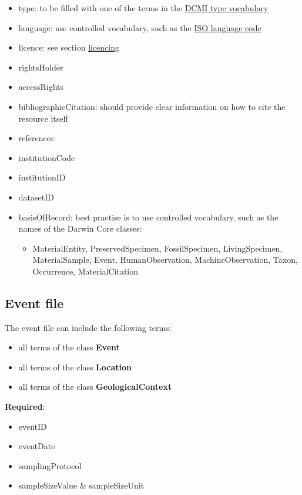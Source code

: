 \documentclass[
]{book}
\providecommand{\tightlist}{%
  \setlength{\itemsep}{0pt}\setlength{\parskip}{0pt}}
\begin{document}
\begin{itemize}
\item
  type: to be filled with one of the terms in the \href{https://www.dublincore.org/specifications/dublin-core/dcmi-terms/\#section-7}{DCMI type vocabulary}
\item
  language: use controlled vocabulary, such as the \href{https://www.w3schools.com/tags/ref_language_codes.asp}{ISO language code}
\item
  licence: see section \protect\hyperlink{Licencing}{licencing}
\item
  rightsHolder
\item
  accessRights
\item
  bibliographicCitation: should provide clear information on how to cite the resource itself
\item
  references
\item
  institutionCode
\item
  institutionID
\item
  datasetID
\item
  basisOfRecord: best practise is to use controlled vocabulary, such as the names of the Darwin Core classes:

  \begin{itemize}
  \tightlist
  \item
    MaterialEntity, PreservedSpecimen, FossilSpecimen, LivingSpecimen, MaterialSample, Event, HumanObservation, MachineObservation, Taxon, Occurrence, MaterialCitation
  \end{itemize}
\end{itemize}

\hypertarget{event-file}{%
\subsection{Event file}\label{event-file}}

The event file can include the following terms:

\begin{itemize}
\tightlist
\item
  all terms of the class \textbf{Event}
\item
  all terms of the class \textbf{Location}
\item
  all terms of the class \textbf{GeologicalContext}
\end{itemize}

\textbf{Required}:

\begin{itemize}
\item
  eventID
\item
  eventDate
\item
  samplingProtocol
\item
  sampleSizeValue {\&} sampleSizeUnit
\end{itemize}
\end{document}
